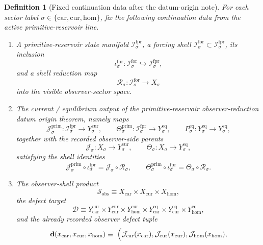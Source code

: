 \documentclass[11pt]{article}
\newcommand{\Car}{\mathrm{car}}
\newcommand{\Cur}{\mathrm{cur}}
\newcommand{\Hom}{\mathrm{hom}}
\newcommand{\ForPrimSpace}[1]{\mathcal I_{#1}^{\mathrm{fpr}}}
\newcommand{\ForSpace}[1]{\mathcal I_{#1}^{\mathrm{for}}}
\newcommand{\ForPrimInc}[1]{\iota_{#1}^{\mathrm{fpr}}}
\newcommand{\Reduction}[1]{\mathcal R_{#1}}
\newcommand{\ObsShell}{\mathcal S_{\mathrm{obs}}}
\newcommand{\ObsCurrent}[1]{\mathcal J_{#1}}
\newcommand{\ObsTheta}[1]{\Theta_{#1}}
\newcommand{\PrimCurrent}[1]{\mathcal J_{#1}^{\mathrm{prim}}}
\newcommand{\PrimTheta}[1]{\Theta_{#1}^{\mathrm{prim}}}
\newcommand{\EqProj}[1]{P_{#1}^{\mathrm{eq}}}
\newcommand{\DefectSpace}{\mathcal D}
\newcommand{\DefectTuple}{\mathbf d}
\newtheorem{definition}{Definition}
\begin{document}
\begin{definition}[Fixed continuation data after the datum-origin note]
\label{def:fixed}
For each sector label \(\sigma\in\{\Car,\Cur,\Hom\}\), fix the following continuation data from the active primitive-reservoir line.
\begin{enumerate}
    \item A primitive-reservoir state manifold \(\ForPrimSpace{\sigma}\), a forcing shell \(\ForSpace{\sigma}\subset\ForPrimSpace{\sigma}\), its inclusion
    \[
    \ForPrimInc{\sigma}:\ForSpace{\sigma}\hookrightarrow\ForPrimSpace{\sigma},
    \]
    and a shell reduction map
    \[
    \Reduction{\sigma}:\ForSpace{\sigma}\to X_{\sigma}
    \]
    into the visible observer-sector space.
    \item The current / equilibrium output of the primitive-reservoir observer-reduction datum origin theorem, namely maps
    \[
    \PrimCurrent{\sigma}:\ForPrimSpace{\sigma}\to Y_{\sigma}^{\mathrm{cur}},
    \qquad
    \PrimTheta{\sigma}:\ForPrimSpace{\sigma}\to Y_{\sigma}^{\mathrm{eq}},
    \qquad
    \EqProj{\sigma}:Y_{\sigma}^{\mathrm{eq}}\to Y_{\sigma}^{\mathrm{eq}},
    \]
    together with the recorded observer-side parents
    \[
    \ObsCurrent{\sigma}:X_{\sigma}\to Y_{\sigma}^{\mathrm{cur}},
    \qquad
    \ObsTheta{\sigma}:X_{\sigma}\to Y_{\sigma}^{\mathrm{eq}},
    \]
    satisfying the shell identities
    \begin{equation}
    \PrimCurrent{\sigma}\circ\ForPrimInc{\sigma}
    =
    \ObsCurrent{\sigma}\circ\Reduction{\sigma},
    \qquad
    \PrimTheta{\sigma}\circ\ForPrimInc{\sigma}
    =
    \ObsTheta{\sigma}\circ\Reduction{\sigma}.
    \label{eq:shell_restriction}
    \end{equation}
    \item The observer-shell product
    \[
    \ObsShell
    \equiv
    X_{\Car}\times X_{\Cur}\times X_{\Hom},
    \]
    the defect target
    \[
    \DefectSpace
    \equiv
    Y_{\Car}^{\mathrm{cur}}
    \times
    Y_{\Cur}^{\mathrm{cur}}
    \times
    Y_{\Hom}^{\mathrm{cur}}
    \times
    Y_{\Car}^{\mathrm{eq}}
    \times
    Y_{\Cur}^{\mathrm{eq}}
    \times
    Y_{\Hom}^{\mathrm{eq}},
    \]
    and the already recorded observer defect tuple
    \begin{equation}
    \begin{aligned}
    \DefectTuple(x_{\Car},x_{\Cur},x_{\Hom})
    \equiv\;
    \Bigl(
    &\ObsCurrent{\Car}(x_{\Car}),
    \ObsCurrent{\Cur}(x_{\Cur}),
    \ObsCurrent{\Hom}(x_{\Hom}),
    \\

\end{aligned}
\end{equation}
\end{enumerate}
\end{definition}
\end{document}
